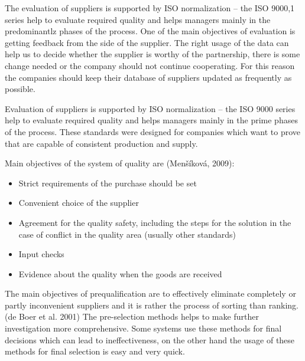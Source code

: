 \documentclass[oneside,12pt]{article}%
\begin{document}
The evaluation of suppliers is supported by ISO normalization – the ISO 9000,1 series help to evaluate required quality and helps managers mainly in the predominantlz phases of the process.
One of the main objectives of evaluation is getting feedback from the side of the supplier. The right usage of the data can help us to decide whether the supplier is worthy of the partnership, there is some change needed or the company should not continue cooperating. For this reason the companies should keep their database of suppliers updated as frequently as possible.


Evaluation of suppliers is supported by ISO normalization – the ISO 9000 series help to evaluate required quality and helps managers mainly in the prime phases of the process. These standards were designed for companies which want to prove that are capable of consistent production and supply.

Main objectives of the system of quality are (Men\v{s}\'{i}kov\'{a}, 2009):
  \begin{itemize}
    \item Strict requirements of the purchase should be set
    \item Convenient choice of the supplier
    \item Agreement for the quality safety, including the steps for the solution in the case of conflict in the quality area (usually other standards)
    \item Input checks
    \item Evidence about the quality when the goods are received
  \end{itemize}

The main objectives of prequalification are to effectively eliminate completely or partly inconvenient suppliers and it is rather the process of sorting than ranking. (de Boer et al. 2001) The pre-selection methods helps to make further investigation more comprehensive. Some systems use these methods for final decisions which can lead to ineffectiveness, on the other hand the usage of these methods for final selection is easy and very quick.
\end{document}
